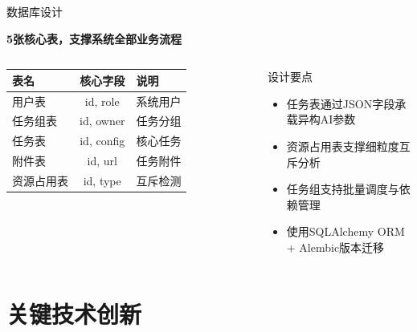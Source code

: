 \documentclass[aspectratio=169,UTF8,xcolor=table]{ctexbeamer}
\begin{document}
\begin{frame}{数据库设计}
  \begin{center}
    \textbf{5张核心表，支撑系统全部业务流程}
  \end{center}

  \vspace{0.3cm}
  \begin{columns}[T]
    \begin{table}
      \centering
      \begin{tabular}{|l|c|l|}
        \hline
        \textbf{表名} & \textbf{核心字段} & \textbf{说明} \\
        \hline
        用户表 & id, role & 系统用户 \\
        \hline
        任务组表 & id, owner & 任务分组 \\
        \hline
        任务表 & id, config & 核心任务 \\
        \hline
        附件表 & id, url & 任务附件 \\
        \hline
        资源占用表 & id, type & 互斥检测 \\
        \hline
      \end{tabular}
    \end{table}

    \begin{block}{设计要点}
      \begin{itemize}
        \item 任务表通过JSON字段承载异构AI参数
        \item 资源占用表支撑细粒度互斥分析
        \item 任务组支持批量调度与依赖管理
        \item 使用SQLAlchemy ORM + Alembic版本迁移
      \end{itemize}
    \end{block}
  \end{columns}
\end{frame}

\section{关键技术创新}
\end{document}
